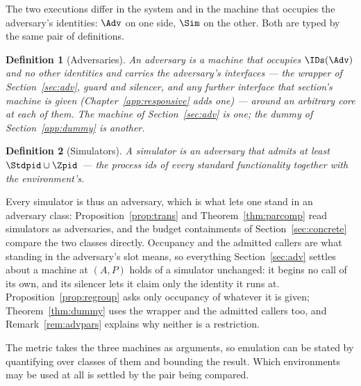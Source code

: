 \documentclass[10pt,oneside,openany]{book}
\theoremstyle{accentdef}
\newtheorem{definition}{Definition}[chapter]
\theoremstyle{accentplain}
\begin{document}
The two executions differ in the system and in the machine that occupies the adversary's
identities: $\Adv$ on one side, $\Sim$ on the other. Both are typed by the same pair of
definitions.

\begin{definition}[Adversaries]\label{def:advcls}
An \emph{adversary} is a machine that occupies $\IDs(\Adv)$ and no other identities and carries
the adversary's interfaces --- the wrapper of Section~\ref{sec:adv}, guard and silencer, and any
further interface that section's machine is given (Chapter~\ref{app:responsive} adds one) ---
around an arbitrary core at each of them. The machine of Section~\ref{sec:adv} is one; the dummy
of Section~\ref{app:dummy} is another.
\end{definition}

\begin{definition}[Simulators]\label{def:sim}
A \emph{simulator} is an adversary that admits at least $\Stdpid \cup \Zpid$ --- the process ids of
every standard functionality together with the environment's.
\end{definition}

Every simulator is thus an adversary, which is what lets one stand in an adversary class:
Proposition~\ref{prop:trans} and Theorem~\ref{thm:parcomp} read simulators as adversaries, and
the budget containments of Section~\ref{sec:concrete} compare the two classes directly.
Occupancy and the admitted callers are what standing in the adversary's slot means, so everything
Section~\ref{sec:adv} settles about a machine at $(A,P)$ holds of a simulator unchanged: it
begins no call of its own, and its silencer lets it claim only the identity it runs at.
Proposition~\ref{prop:regroup} asks only occupancy of whatever it is given;
Theorem~\ref{thm:dummy} uses the wrapper and the admitted callers too, and
Remark~\ref{rem:advpars} explains why neither is a restriction.

The metric takes the three machines as arguments, so emulation can be stated by quantifying over
classes of them and bounding the result. Which environments may be used at all is settled by the
pair being compared.
\end{document}
